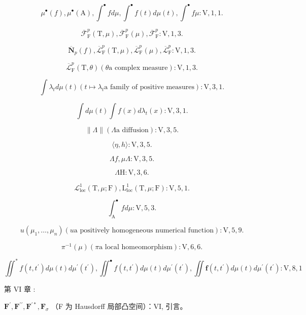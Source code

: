 \[
\mu^ {\bullet} (f), \mu^ {\bullet} (\mathrm{A}), \int^ {\bullet} f d \mu , \int^ {\bullet} f (t) d \mu (t), \int^ {\bullet} f \mu : \mathrm{V}, 1, 1.
\]

\[
\overline {{\mathcal {F}}} _ {\mathrm{F}} ^ {p} (\mathrm{T}, \mu), \overline {{\mathcal {F}}} _ {\mathrm{F}} ^ {p} (\mu), \overline {{\mathcal {F}}} _ {\mathrm{F}} ^ {p}: \mathrm{V}, 1, 3.
\]

\[
\overline {{\mathbf {N}}} _ {p} (f), \overline {{\mathcal {L}}} _ {\mathrm{F}} ^ {p} (\mathrm{T}, \mu), \overline {{\mathcal {L}}} _ {\mathrm{F}} ^ {p} (\mu), \overline {{\mathcal {L}}} _ {\mathrm{F}} ^ {p}: \mathrm{V}, 1, 3.
\]

\[
\overline {{\mathcal {L}}} _ {\mathrm{F}} ^ {p} (\mathrm{T}, \theta) (\theta \text {a complex measure}): \mathrm{V,1,3.}
\]

\[
\int \lambda_ {t} d \mu (t) (t \mapsto \lambda_ {t} \text {a family of positive measures}): \mathrm{V}, 3, 1.
\]

\[
\int d \mu (t) \int f (x) d \lambda_ {t} (x): \mathrm{V}, 3, 1.
\]

\[
\| \Lambda \| (\Lambda \text {a diffusion}): \mathrm{V}, 3, 5.
\]

\[
\langle \eta , h \rangle : \mathrm{V}, 3, 5.
\]

\[
\Lambda f, \mu \Lambda : \mathrm{V}, 3, 5.
\]

\[
\Lambda \mathrm{H}: \mathrm{V}, 3, 6.
\]

\[
\mathcal {L} _ {\mathrm{loc}} ^ {1} (\mathrm{T}, \mu ; \mathrm{F}), \mathrm{L} _ {\mathrm{loc}} ^ {1} (\mathrm{T}, \mu ; \mathrm{F}): \mathrm{V}, 5, 1.
\]

\[
\int_ {\mathrm{A}} ^ {\bullet} f d \mu : \mathrm{V}, 5, 3.
\]

\[
u (\mu_ {1}, \dots , \mu_ {n}) (u \text {a positively homogeneous numerical function}): \mathrm{V}, 5, 9.
\]

\[
\pi^ {- 1} (\mu) (\pi \text {a local homeomorphism}) \colon \mathrm{V,6,6.}
\]

\[
\iint^ {*} f (t, t ^ {\prime}) d \mu (t) d \mu^ {\prime} (t ^ {\prime}), \iint^ {\bullet} f (t, t ^ {\prime}) d \mu (t) d \mu^ {\prime} (t ^ {\prime}), \iint \mathbf {f} (t, t ^ {\prime}) d \mu (t) d \mu^ {\prime} (t ^ {\prime}): \mathrm{V}, 8, 1
\]

第 VI 章 :

\(\mathbf{F}^{\prime},\mathbf{F}^{\prime \prime},\mathbf{F}^{\prime *},\mathbf{F}_{\sigma}\) （F 为 Hausdorff 局部凸空间）：VI, 引言。

